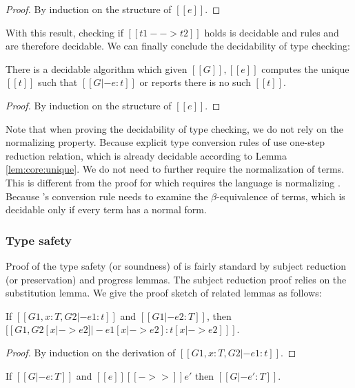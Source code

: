 \begin{proof}
	By induction on the structure of $[[e]]$.
\end{proof}

With this result, checking if $[[t1 --> t2]]$ holds is decidable and rules  and  are therefore decidable. We can finally conclude the decidability of type checking:

\begin{lem}\label{lem:core:decide}
	There is a decidable algorithm which given $[[G]], [[e]]$ computes the unique $[[t]]$ such that $[[G |- e:t]]$ or reports there is no such $[[t]]$.
\end{lem}

\begin{proof}
	By induction on the structure of $[[e]]$.
\end{proof}

Note that when proving the decidability of type checking, we do not rely on the normalizing property. Because explicit type conversion rules of \name use one-step reduction relation, which is already decidable according to Lemma \ref{lem:core:unique}. We do not need to further require the normalization of terms. This is different from the proof for \cc which requires the language is normalizing . Because \cc's conversion rule needs to examine the $\beta$-equivalence of terms, which is decidable only if every term has a normal form.

\subsubsection{Type safety}
Proof of the type safety (or soundness) of \name is fairly standard by subject reduction (or preservation) and progress lemmas. The subject reduction proof relies on the substitution lemma. We give the proof sketch of related lemmas as follows:

\begin{lem}\label{lem:subst}
	If $[[G1, x:T, G2 |- e1:t]]$ and $[[G1 |- e2:T]]$, then $[[G1, G2 [x |-> e2] |- e1[x |-> e2]  : t[x |-> e2] ]]$.
\end{lem}

\begin{proof}
    By induction on the derivation of $[[G1, x:T, G2 |- e1:t]]$.
\end{proof}

\begin{lem}
If $[[G |- e:T]]$ and $[[e]] [[->>]] e'$ then $[[G |- e':T]]$.
\end{lem}

